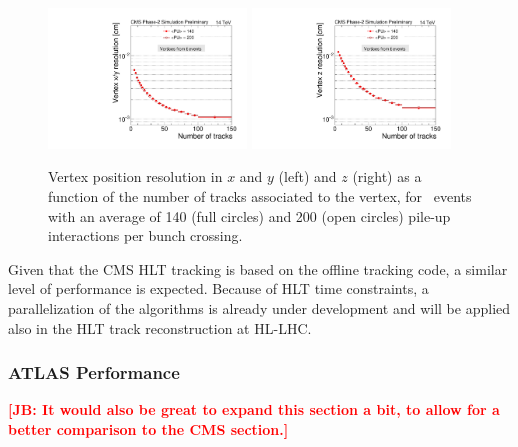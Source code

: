 \begin{figure}[h!tbp]
\begin{center}
  \includegraphics[width=0.47\textwidth]{figures/cmsupgrade/TDR-17-001_fig6_13_a_RecoAllAssoc2GenMatched_ResolX_vs_NumTracks_Sigma_PU.pdf} \hfill
  \includegraphics[width=0.47\textwidth]{figures/cmsupgrade/TDR-17-001_fig6_13_b_RecoAllAssoc2GenMatched_ResolZ_vs_NumTracks_Sigma_PU.pdf}
  \caption{Vertex position resolution in $x$ and $y$ (left) and $z$ (right) as a function of the number of tracks associated to the vertex, for \ttbar~events with an average of 140 (full circles) and 200 (open circles) pile-up interactions per bunch crossing. 
 }
  \label{fig:cmsvertex}
\end{center}
\end{figure}

Given that the CMS HLT tracking is based on the offline tracking code, a similar level of performance is expected.
Because of HLT time constraints, a parallelization of the algorithms is already under development and will be applied also in the HLT track reconstruction at HL-LHC.

\subsubsection{ATLAS Performance}

{\bf \textcolor{red}{[JB: It would also be great to expand this section a bit, to allow for a better comparison to the CMS section.]}}

\noindent {\bf \textcolor{red}{[BS: Is there any additional tracking performance that can go here?]}}

